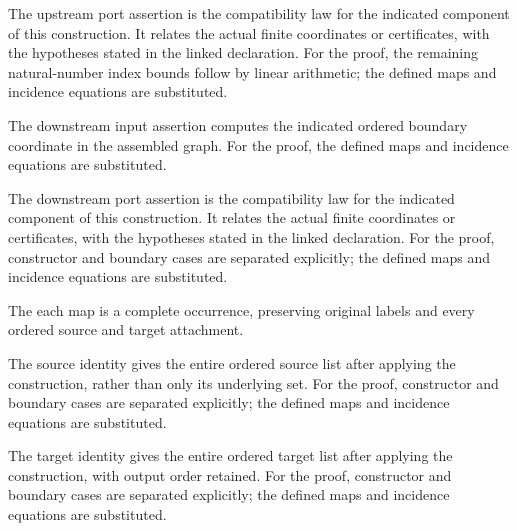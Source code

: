 The upstream port assertion is the compatibility law for the indicated component of this construction. It relates the actual finite coordinates or certificates, with the hypotheses stated in the linked declaration.
For the proof, the remaining natural-number index bounds follow by linear arithmetic; the defined maps and incidence equations are substituted.
\par{}

The downstream input assertion computes the indicated ordered boundary coordinate in the assembled graph.
For the proof, the defined maps and incidence equations are substituted.
\par{}

The downstream port assertion is the compatibility law for the indicated component of this construction. It relates the actual finite coordinates or certificates, with the hypotheses stated in the linked declaration.
For the proof, constructor and boundary cases are separated explicitly; the defined maps and incidence equations are substituted.
\par{}

The each map is a complete occurrence, preserving original labels and every ordered source and target attachment.
\par{}

The source identity gives the entire ordered source list after applying the construction, rather than only its underlying set.
For the proof, constructor and boundary cases are separated explicitly; the defined maps and incidence equations are substituted.
\par{}

The target identity gives the entire ordered target list after applying the construction, with output order retained.
For the proof, constructor and boundary cases are separated explicitly; the defined maps and incidence equations are substituted.
\par{}

